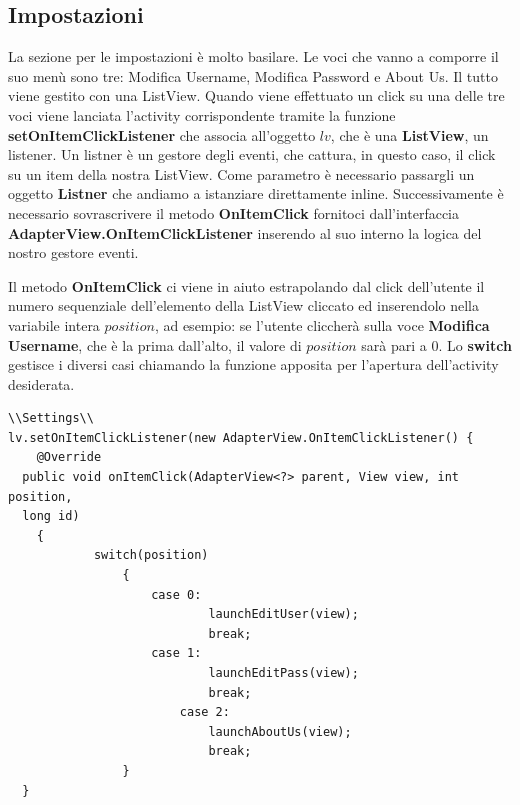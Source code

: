 \documentclass[a4paper, 50pt, twoside]{article}
\begin{document}
\subsection{Impostazioni}
La sezione per le impostazioni è molto basilare. Le voci che vanno a comporre il suo menù sono tre: Modifica Username, Modifica Password e About Us. Il tutto viene gestito con una ListView. Quando viene effettuato un click su una delle tre voci viene lanciata l’activity corrispondente tramite la funzione \textbf{setOnItemClickListener} che associa all'oggetto $lv$, che è una \textbf{ListView}, un listener. Un listner è un gestore degli eventi, che cattura, in questo caso, il click su un item della nostra ListView. Come parametro è necessario passargli un oggetto \textbf{Listner} che andiamo a istanziare direttamente inline. Successivamente è necessario sovrascrivere il metodo \textbf{OnItemClick} fornitoci dall'interfaccia \textbf{AdapterView.OnItemClickListener} inserendo al suo interno la logica del nostro gestore eventi.

Il metodo \textbf{OnItemClick} ci viene in aiuto estrapolando dal click dell'utente il numero sequenziale dell'elemento della ListView cliccato ed inserendolo nella variabile intera $position$, ad esempio: se l'utente cliccherà sulla voce \textbf{Modifica Username}, che è la prima dall'alto, il valore di $position$ sarà pari a $0$. Lo \textbf{switch} gestisce i diversi casi chiamando la funzione apposita per l'apertura dell'activity desiderata.
\begin{lstlisting}
\\Settings\\
lv.setOnItemClickListener(new AdapterView.OnItemClickListener() {
	@Override
  public void onItemClick(AdapterView<?> parent, View view, int position,
  long id)
	{
        	switch(position)
                {
                	case 0:
                        	launchEditUser(view);
                       		break;
                	case 1:
                        	launchEditPass(view);
                        	break;
                        case 2:
                        	launchAboutUs(view);
                        	break;
                }
  }
\end{lstlisting}
\end{document}
